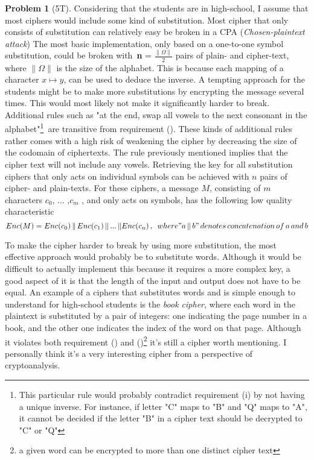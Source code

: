 \documentclass[11pt,twoside]{article}
\theoremstyle{definition}
\newtheorem{amsproblem}{Problem}
\newenvironment{problem}[1][]{%
  \begin{amsproblem}[#1]
  }{%
  \end{amsproblem}
}
\newcommand{\TP}[1]{#1T}
\begin{document}
\begin{problem}[\TP{5}]
\item Considering that the students are in high-school, I assume that most ciphers would include some kind of substitution. Most cipher that only consists of substitution can relatively easy be broken in a CPA (\textit{Chosen-plaintext attack}) \newline 
The most basic implementation, only based on a one-to-one symbol substitution, could be broken with\, \textbf{n} = $\frac{\|\Omega\|}{2}$ pairs of plain- and cipher-text, where $\|\Omega\|$ is the size of the alphabet.\newline 
This is because each mapping of a character ${x}\mapsto{y}$, can be used to deduce the inverse. \newline 
A tempting approach for the students might be to make more substitutions by encrypting the message several times. This would most likely not make it significantly harder to break. \newline 
Additional rules such as "at the end, swap all vowels to the next consonant in the alphabet"\footnote{This particular rule would probably contradict requirement (i) by not having a unique inverse. For instance, if letter "C" maps to "B" and "Q" maps to "A", it cannot be decided if the letter "B" in a cipher text should be decrypted to "C" or "Q"} \,are transitive from requirement (\small \textbf{}).
These kinds of additional rules rather comes with a high risk of weakening the cipher by decreasing the size of the codomain of ciphertexts. The rule previously mentioned implies that the cipher text will not include any vowels. \newline 
Retrieving the key for all substitution ciphers that only acts on individual symbols can be achieved with $n$ pairs of cipher- and plain-texts. For these ciphers, a message $M$, consisting of $m$ characters $c_0$, ... ,$c_m$ , and only acts on symbols, has the following low quality characteristic 
  $$ Enc(M) = Enc(c_0) \,\Vert \, Enc(c_1) \, \Vert \,... \, \Vert{ Enc(c_n)} \, , \,\,\, where  "a\, \Vert \,b"  \, denotes\, concatenation \, of \, a \, and  \,b
  $$
  \item To make the cipher harder to break by using more substitution, the most effective approach would probably be to substitute words. Although it would be difficult to actually implement this because it requires a more complex key, a good aspect of it is that the length of the input and output does not have to be equal. \newline 
  An example of a ciphers that substitutes words and is simple enough to understand for high-school students is the \textit{book cipher}, where each word in the plaintext is substituted by a pair of integers: one indicating the page number in a book, and the other one indicates the index of the word on that page. Although it violates both requirement (\small \textbf{}) and (\small \textbf{})\footnote{a given word can be encrypted to more than one distinct cipher text} it's still a cipher worth mentioning. I personally think it's a very interesting cipher from a perspective of cryptoanalysis. \newline

\end{problem}
\end{document}
